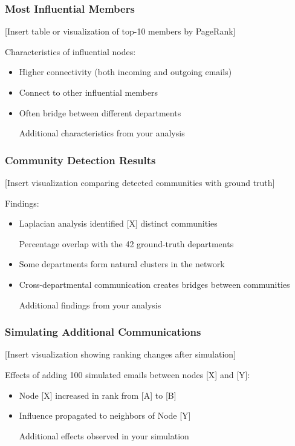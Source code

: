 \documentclass{beamer}
\begin{document}
\begin{frame}
    \frametitle{Most Influential Members}
    [Insert table or visualization of top-10 members by PageRank]
    
    Characteristics of influential nodes:
    \begin{itemize}
        \item Higher connectivity (both incoming and outgoing emails)
        \item Connect to other influential members
        \item Often bridge between different departments
        \item [Additional characteristics from your analysis]
    \end{itemize}
\end{frame}

\begin{frame}
    \frametitle{Community Detection Results}
    [Insert visualization comparing detected communities with ground truth]
    
    Findings:
    \begin{itemize}
        \item Laplacian analysis identified [X] distinct communities
        \item [Percentage] overlap with the 42 ground-truth departments
        \item Some departments form natural clusters in the network
        \item Cross-departmental communication creates bridges between communities
        \item [Additional findings from your analysis]
    \end{itemize}
\end{frame}

\begin{frame}
    \frametitle{Simulating Additional Communications}
    [Insert visualization showing ranking changes after simulation]
    
    Effects of adding 100 simulated emails between nodes [X] and [Y]:
    \begin{itemize}
        \item Node [X] increased in rank from [A] to [B]
        \item Influence propagated to neighbors of Node [Y]
        \item [Additional effects observed in your simulation]
    \end{itemize}
\end{frame}
\end{document}
